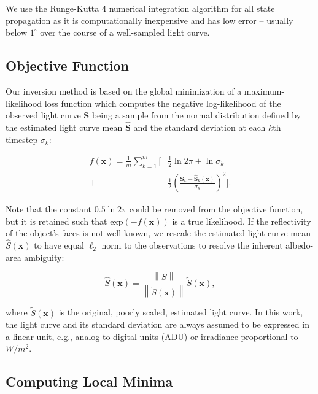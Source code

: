 \documentclass[a4paper,twocolumn]{spaceDebrisC} %
\newcommand{\vctr}[1]{\bm{#1}}
\newcommand{\norm}[1]{\left\lVert#1\right\rVert}
\begin{document}
We use the Runge-Kutta 4 numerical integration algorithm for all state propagation as it is computationally inexpensive and has low error -- usually below $1^\circ$ over the course of a well-sampled light curve.

\subsection{Objective Function}

Our inversion method is based on the global minimization of a maximum-likelihood loss function which computes the negative log-likelihood of the observed light curve $\vctr{S}$ being a sample from the normal distribution defined by the estimated light curve mean $\hat{\vctr{S}}$ and the standard deviation at each $k$th timestep $\sigma_k$:

\begin{equation} \label{eq:nll_loss}
  \begin{split}
 f(\vctr{x}) = \frac{1}{m}\sum_{k=1}^{m}\Biggl[&\frac{1}{2} \ln2\pi + \ln\sigma_k \\ + &\frac{1}{2}\left(\frac{\vctr{S}_k - \hat{\vctr{S}}_k(\vctr{x})}{\sigma_k}\right)^2 \Biggr].
  \end{split}
 \end{equation}

Note that the constant $0.5\ln2\pi$ could be removed from the objective function, but it is retained such that $\text{exp}\left(-f(\vctr{x})\right)$ is a true likelihood. If the reflectivity of the object's faces is not well-known, we rescale the estimated light curve mean $\hat{S}(\vctr{x})$ to have equal $\ell_2$ norm to the observations to resolve the inherent albedo-area ambiguity:

\begin{equation}
 \hat{S}(\vctr{x}) = \frac{\norm{S}}{\norm{\tilde{S}(\vctr{x})}} \tilde{S}(\vctr{x}),
\end{equation}

\noindent
where $\tilde{S}(\vctr{x})$ is the original, poorly scaled, estimated light curve. In this work, the light curve and its standard deviation are always assumed to be expressed in a linear unit, e.g., analog-to-digital units (ADU) or irradiance proportional to $W/m^2$.

\subsection{Computing Local Minima} \label{sec:run_solver}
\end{document}
